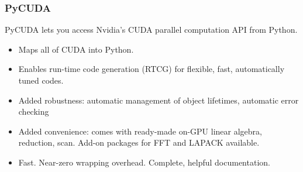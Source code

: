 \documentclass[xcolor=x11names,table]{beamer}
\begin{document}
\begin{frame}
\frametitle{PyCUDA}
	PyCUDA lets you access Nvidia's CUDA parallel computation API from Python.
	\begin{itemize}
		\item Maps all of CUDA into Python.
		\item Enables run-time code generation (RTCG) for flexible, fast, automatically tuned codes.
		\item Added robustness: automatic management of object lifetimes, automatic error checking
		\item Added convenience: comes with ready-made on-GPU linear algebra, reduction, scan. Add-on packages for FFT and LAPACK available.
		\item Fast. Near-zero wrapping overhead.
		Complete, helpful documentation.
	\end{itemize}
\end{frame}

\end{document}
